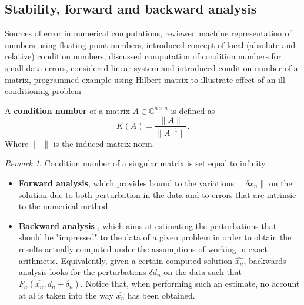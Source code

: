 \documentclass{article}
\theoremstyle{remark}
\newtheorem*{remark}{Remark}
\begin{document}
 


\subsection{Stability, forward and backward analysis}%
\label{sub:stability_forward_and_backward_analysis}

\begin{tcolorbox}
  Sources of error in numerical computations, reviewed machine representation of numbers using floating point numbers, introduced concept of local (absolute and relative) condition numbers, discussed computation of condition numbers for small data errors, considered linear system and introduced condition number of a matrix, programmed example using Hilbert matrix to illustrate effect of an ill-conditioning problem	
\end{tcolorbox}

\begin{definition}
  A \textbf{condition number} of a matrix $A \in \mathbb{C}^{n\times n }$ is defined as 
\begin{equation}
\label{eq:condition_number}
K\left( A \right) =  \frac{\|A\|}{\|A^{-1}\|}
.\end{equation}
Where $\|\cdot\|$ is the induced matrix norm. 
\end{definition}

\begin{remark}
  Condition number of a singular matrix is set equal to infinity.
\end{remark}

\begin{definition}
  \begin{itemize}
    \item \textbf{Forward analysis}, which provides bound to the variations $\|\delta x_{n}\|$ on the solution due to both perturbation in the data and to errors that are intrinsic to the numerical method.
  \item \textbf{Backward analysis} , which aims at estimating the perturbations that should be "impressed" to the data of a given problem in order to obtain the results actually computed under the assumptions of working in exact arithmetic. Equivalently, given a certain computed solution $\hat{x_n}$, backwards analysis looks for the perturbations $\delta d_{n}$ on the data such that $F_{n} \left( \hat{x_n}, d_n + \delta_n \right)$. Notice that, when performing such an
    estimate, no account at al is taken into the way $\hat{x_{n}}$ has been obtained.
  \end{itemize}
\end{definition}
  
\end{document}
